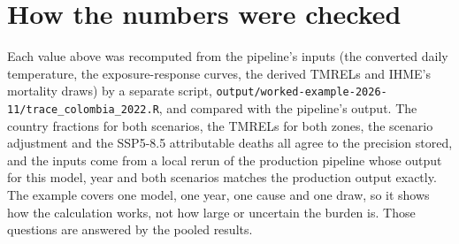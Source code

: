 \documentclass[11pt]{ozreport}
\begin{document}
\section{How the numbers were checked}

Each value above was recomputed from the pipeline's inputs (the converted daily temperature, the exposure-response curves, the derived TMRELs and IHME's mortality draws) by a separate script, \texttt{output/worked-example-2026-11/trace\_colombia\_2022.R}, and compared with the pipeline's output. The country fractions for both scenarios, the TMRELs for both zones, the scenario adjustment and the SSP5-8.5 attributable deaths all agree to the precision stored, and the inputs come from a local rerun of the production pipeline whose output for this model, year and both scenarios matches the production output exactly. The example covers one model, one year, one cause and one draw, so it shows how the calculation works, not how large or uncertain the burden is. Those questions are answered by the pooled results.
\end{document}
